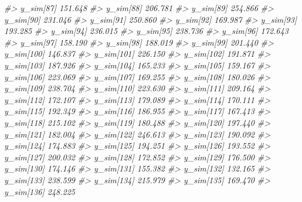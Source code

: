 \documentclass[
  10pt,
  italian,
  a4paper,
  extrafontsizes,onecolumn,openright
  ]{memoir}
\newenvironment{Shaded}{\begin{snugshade}}{\end{snugshade}}
\newcommand{\CommentTok}[1]{\textcolor[rgb]{0.56,0.35,0.01}{\textit{#1}}}
\begin{document}
\begin{Shaded}
\begin{Highlighting}[]
\CommentTok{\#\textgreater{}   y\_sim[87]  151.648}
\CommentTok{\#\textgreater{}   y\_sim[88]  206.781}
\CommentTok{\#\textgreater{}   y\_sim[89]  254.866}
\CommentTok{\#\textgreater{}   y\_sim[90]  231.046}
\CommentTok{\#\textgreater{}   y\_sim[91]  250.860}
\CommentTok{\#\textgreater{}   y\_sim[92]  169.987}
\CommentTok{\#\textgreater{}   y\_sim[93]  193.285}
\CommentTok{\#\textgreater{}   y\_sim[94]  236.015}
\CommentTok{\#\textgreater{}   y\_sim[95]  238.736}
\CommentTok{\#\textgreater{}   y\_sim[96]  172.643}
\CommentTok{\#\textgreater{}   y\_sim[97]  158.190}
\CommentTok{\#\textgreater{}   y\_sim[98]  188.019}
\CommentTok{\#\textgreater{}   y\_sim[99]  201.440}
\CommentTok{\#\textgreater{}   y\_sim[100] 146.837}
\CommentTok{\#\textgreater{}   y\_sim[101] 226.150}
\CommentTok{\#\textgreater{}   y\_sim[102] 191.871}
\CommentTok{\#\textgreater{}   y\_sim[103] 187.926}
\CommentTok{\#\textgreater{}   y\_sim[104] 165.233}
\CommentTok{\#\textgreater{}   y\_sim[105] 159.167}
\CommentTok{\#\textgreater{}   y\_sim[106] 223.069}
\CommentTok{\#\textgreater{}   y\_sim[107] 169.255}
\CommentTok{\#\textgreater{}   y\_sim[108] 180.026}
\CommentTok{\#\textgreater{}   y\_sim[109] 238.704}
\CommentTok{\#\textgreater{}   y\_sim[110] 223.630}
\CommentTok{\#\textgreater{}   y\_sim[111] 209.164}
\CommentTok{\#\textgreater{}   y\_sim[112] 172.107}
\CommentTok{\#\textgreater{}   y\_sim[113] 179.089}
\CommentTok{\#\textgreater{}   y\_sim[114] 170.111}
\CommentTok{\#\textgreater{}   y\_sim[115] 192.349}
\CommentTok{\#\textgreater{}   y\_sim[116] 186.955}
\CommentTok{\#\textgreater{}   y\_sim[117] 167.413}
\CommentTok{\#\textgreater{}   y\_sim[118] 215.102}
\CommentTok{\#\textgreater{}   y\_sim[119] 180.488}
\CommentTok{\#\textgreater{}   y\_sim[120] 197.440}
\CommentTok{\#\textgreater{}   y\_sim[121] 182.004}
\CommentTok{\#\textgreater{}   y\_sim[122] 246.613}
\CommentTok{\#\textgreater{}   y\_sim[123] 190.092}
\CommentTok{\#\textgreater{}   y\_sim[124] 174.883}
\CommentTok{\#\textgreater{}   y\_sim[125] 194.251}
\CommentTok{\#\textgreater{}   y\_sim[126] 193.552}
\CommentTok{\#\textgreater{}   y\_sim[127] 200.032}
\CommentTok{\#\textgreater{}   y\_sim[128] 172.852}
\CommentTok{\#\textgreater{}   y\_sim[129] 176.500}
\CommentTok{\#\textgreater{}   y\_sim[130] 174.146}
\CommentTok{\#\textgreater{}   y\_sim[131] 155.382}
\CommentTok{\#\textgreater{}   y\_sim[132] 132.165}
\CommentTok{\#\textgreater{}   y\_sim[133] 238.599}
\CommentTok{\#\textgreater{}   y\_sim[134] 215.979}
\CommentTok{\#\textgreater{}   y\_sim[135] 169.470}
\CommentTok{\#\textgreater{}   y\_sim[136] 248.225}

\end{Highlighting}
\end{Shaded}
\end{document}
